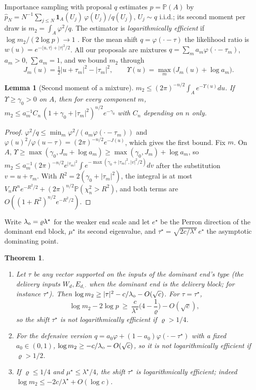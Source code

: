 \documentclass[11pt]{article}
\newtheorem{theorem}{Theorem}
\newtheorem{lemma}{Lemma}
\theoremstyle{definition}
\theoremstyle{remark}
\renewcommand{\P}{\mathbb{P}}
\newcommand{\one}{\mathbf{1}}
\newcommand{\ip}[2]{\langle #1,#2\rangle}
\begin{document}
Importance sampling with proposal $q$ estimates $p=\P(A)$ by
$\hat p_N=N^{-1}\sum_{j\le N}\one_A(U_j)\,\varphi(U_j)/q(U_j)$, $U_j\sim q$ i.i.d.; its second
moment per draw is $m_2=\int_A\varphi^2/q$. The estimator is \emph{logarithmically
efficient} if $\log m_2/(2\log p)\to1$ \citep{AsmussenGlynn2007}. For the mean shift
$q=\varphi(\cdot-\tau)$ the likelihood ratio is $w(u)=e^{-\ip u\tau+|\tau|^2/2}$. All our
proposals are mixtures $q=\sum_ma_m\varphi(\cdot-\tau_m)$, $a_m>0$, $\sum a_m=1$, and we
bound $m_2$ through
\[
J_m(u)=\tfrac12|u+\tau_m|^2-|\tau_m|^2,\qquad \Upsilon(u)=\max_m\big(J_m(u)+\log a_m\big).
\]

\begin{lemma}[Second moment of a mixture]\label{lem:m2}
$m_2\le(2\pi)^{-n/2}\int_Ae^{-\Upsilon(u)}du$. If $\Upsilon\ge\gamma_0>0$ on $A$, then for every
component $m$,
$m_2\le a_m^{-1}C_n\,(1+\gamma_0+|\tau_m|^2)^{n/2}e^{-\gamma_0}$ with $C_n$ depending on $n$
only.
\end{lemma}

\begin{proof}
$\varphi^2/q\le\min_m\varphi^2/(a_m\varphi(\cdot-\tau_m))$ and
$\varphi(u)^2/\varphi(u-\tau)=(2\pi)^{-n/2}e^{-J(u)}$, which gives the first bound. Fix $m$.
On $A$, $\Upsilon\ge\max(\gamma_0,J_m+\log a_m)\ge\max(\gamma_0,J_m)+\log a_m$, so
$m_2\le a_m^{-1}(2\pi)^{-n/2}e^{|\tau_m|^2}\int e^{-\max(\gamma_0+|\tau_m|^2,|v|^2/2)}dv$
after the substitution $v=u+\tau_m$. With $R^2=2(\gamma_0+|\tau_m|^2)$, the integral is
at most $V_nR^ne^{-R^2/2}+(2\pi)^{n/2}\P(\chi^2_n>R^2)$, and both terms are
$O((1+R^2)^{n/2}e^{-R^2/2})$.
\end{proof}

Write $\lambda_{\rm o}=\varrho\lambda^\star$ for the weaker end scale and let $e^\star$ be
the Perron direction of the dominant end block, $\mu^\star$ its second eigenvalue, and
$\tau^\star=\sqrt{2c/\lambda^\star}\,e^\star$ the asymptotic dominating point.

\begin{theorem}\label{thm:single}
\begin{enumerate}
\item[(a)] Let $\tau$ be any vector supported on the inputs of the dominant end's type
(the delivery inputs $W_d,E_{d,\cdot}$ when the dominant end is the delivery block; for
instance $\tau^\star$). Then
$\log m_2\ge|\tau|^2-c/\lambda_{\rm o}-O(\sqrt c)$. For $\tau=\tau^\star$,
\[
\log m_2-2\log p\ \ge\ \frac{c}{\lambda^\star}\Big(4-\frac1\varrho\Big)-O(\sqrt c),
\]
so the shift $\tau^\star$ is not logarithmically efficient if $\varrho>1/4$.
\item[(b)] For the defensive version $q=a_0\varphi+(1-a_0)\varphi(\cdot-\tau^\star)$ with a
fixed $a_0\in(0,1)$, $\log m_2\ge-c/\lambda_{\rm o}-O(\sqrt c)$, so it is not
logarithmically efficient if $\varrho>1/2$.
\item[(c)] If $\varrho\le1/4$ and $\mu^\star\le\lambda^\star/4$, the shift $\tau^\star$ is
logarithmically efficient; indeed $\log m_2\le-2c/\lambda^\star+O(\log c)$.
\end{enumerate}
\end{theorem}
\end{document}
